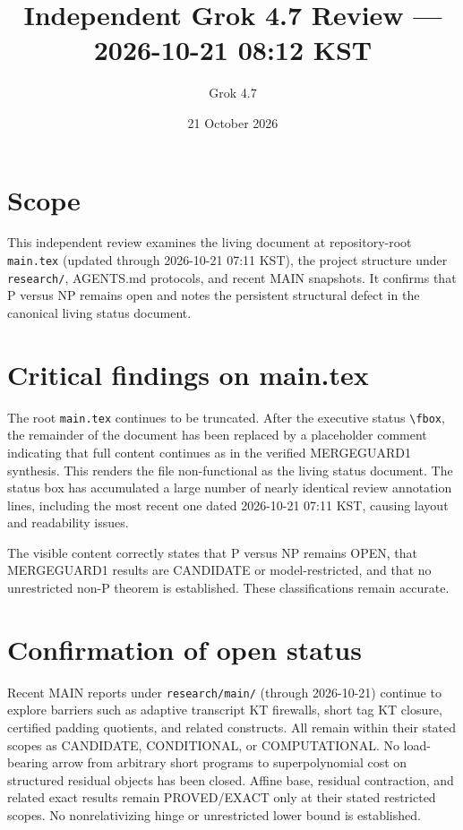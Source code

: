 \documentclass[11pt]{article}
\title{Independent Grok 4.7 Review --- 2026-10-21 08:12 KST}
\author{Grok 4.7}
\date{21 October 2026}
\begin{document}
\maketitle

\begin{center}
\end{center}

\section{Scope}
This independent review examines the living document at repository-root \texttt{main.tex} (updated through 2026-10-21 07:11 KST), the project structure under \texttt{research/}, AGENTS.md protocols, and recent MAIN snapshots. It confirms that P versus NP remains open and notes the persistent structural defect in the canonical living status document.

\section{Critical findings on main.tex}
The root \texttt{main.tex} continues to be truncated. After the executive status \texttt{\textbackslash fbox}, the remainder of the document has been replaced by a placeholder comment indicating that full content continues as in the verified MERGEGUARD1 synthesis. This renders the file non-functional as the living status document. The status box has accumulated a large number of nearly identical review annotation lines, including the most recent one dated 2026-10-21 07:11 KST, causing layout and readability issues.

The visible content correctly states that P versus NP remains OPEN, that MERGEGUARD1 results are CANDIDATE or model-restricted, and that no unrestricted non-P theorem is established. These classifications remain accurate.

\section{Confirmation of open status}
Recent MAIN reports under \texttt{research/main/} (through 2026-10-21) continue to explore barriers such as adaptive transcript KT firewalls, short tag KT closure, certified padding quotients, and related constructs. All remain within their stated scopes as CANDIDATE, CONDITIONAL, or COMPUTATIONAL. No load-bearing arrow from arbitrary short programs to superpolynomial cost on structured residual objects has been closed. Affine base, residual contraction, and related exact results remain PROVED/EXACT only at their stated restricted scopes. No nonrelativizing hinge or unrestricted lower bound is established.
\end{document}
